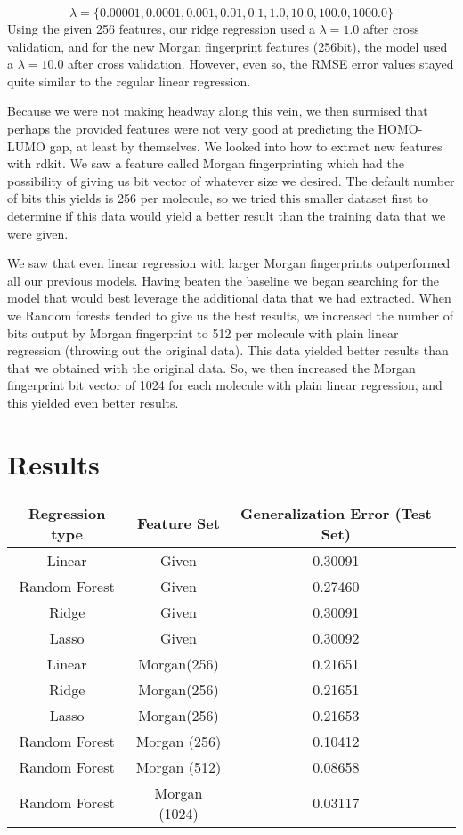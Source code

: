 \documentclass[11pt]{article}
\begin{document}
\[
\lambda = \{ 0.00001, 0.0001, 0.001, 0.01, 0.1, 1.0, 10.0, 100.0, 1000.0 \}
\]
Using the given 256 features, our ridge regression used a $\lambda = 1.0$ after cross validation, and for the new Morgan fingerprint features (256bit), the model used a $\lambda = 10.0$ after cross validation. However, even so, the RMSE error values stayed quite similar to the regular linear regression.

Because we were not making headway along this vein, we then surmised that perhaps the provided features were not very good at predicting the HOMO-LUMO gap, at least by themselves. We looked into how to extract new features with rdkit. We saw a feature called Morgan fingerprinting which had the possibility of giving us bit vector of whatever size we desired. The default number of bits this yields is 256 per molecule, so we tried this smaller dataset first to determine if this data would yield a better result than the training data that we were given. 

We saw that even linear regression with larger Morgan fingerprints outperformed all our previous models. Having beaten the baseline we began searching for the model that would best leverage the additional data that we had extracted. When we Random forests tended to give us the best results, we increased the number of bits output by Morgan fingerprint to 512 per molecule with plain linear regression (throwing out the original data). This data yielded better results than that we obtained with the original data. So, we then increased the Morgan fingerprint bit vector of 1024 for each molecule with plain linear regression, and this yielded even better results.

\section{Results}

\begin{center}
\begin{tabular}{|c|c|c|c|}
\hline
Regression type & Feature Set & Generalization Error (Test Set)\\
\hline
Linear &Given & 0.30091\\
Random Forest & Given& 0.27460\\
Ridge & Given& 0.30091\\
Lasso &Given& 0.30092\\
Linear&Morgan(256)& 0.21651\\
Ridge&Morgan(256)& 0.21651\\
Lasso&Morgan(256)& 0.21653 \\
Random Forest&Morgan (256)& 0.10412\\
Random Forest&Morgan (512)& 0.08658\\
Random Forest&Morgan (1024)& 0.03117\\
\hline
\end{tabular}
\end{center}
\end{document}
